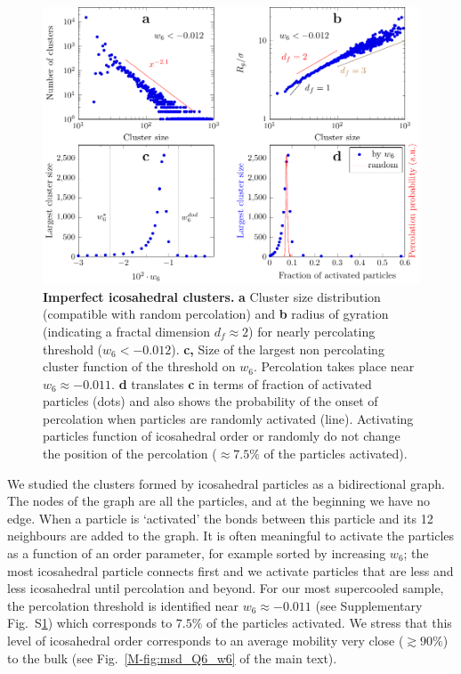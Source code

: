 \documentclass[prl,twocolumn,notitlepage]{revtex4-1}
\begin{document}
\begin{figure}
\begin{center}
\includegraphics{generate_figures-figure7.pdf}
\end{center}
	\caption{\textbf{Imperfect icosahedral clusters.} \textbf{a} Cluster size distribution (compatible with random percolation) and \textbf{b} radius of gyration (indicating a fractal dimension $d_f\approx 2$) for nearly percolating threshold ($w_6<-0.012$). \textbf{c,} Size of the largest non percolating cluster function of the threshold on $w_6$. Percolation takes place near $w_6\approx -0.011$. \textbf{d} translates \textbf{c} in terms of fraction of activated particles (dots) and also shows the probability of the onset of percolation when particles are randomly activated (line). Activating particles function of icosahedral order or randomly do not change the position of the percolation ($\approx7.5\%$ of the particles activated).}
	\label{fig:percolation}
\end{figure}

We studied the clusters formed by icosahedral particles as a bidirectional graph. The nodes of the graph are all the particles, and at the beginning we have no edge. When a particle is `activated' the bonds between this particle and its 12 neighbours are added to the graph. It is often meaningful to activate the particles as a function of an order parameter, for example sorted by increasing $w_6$; the most icosahedral particle connects first and we activate particles that are less and less icosahedral until percolation and beyond. For our most supercooled sample, the percolation threshold is identified near $w_6\approx -0.011$ (see Supplementary Fig.~S\ref{fig:percolation}) which corresponds to $7.5\%$ of the particles activated. We stress that this level of icosahedral order corresponds to an average mobility very close ($\gtrsim 90\%$) to the bulk (see Fig.~\ref{M-fig:msd_Q6_w6} of the main text).
\end{document}
